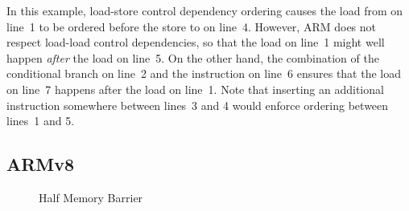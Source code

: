 In this example, load-store control dependency ordering causes
the load from  on line~1 to be ordered before the store to
 on line~4.
However, ARM does not respect load-load control dependencies, so that
the load on line~1 might well happen \emph{after} the
load on line~5.
On the other hand, the combination of the conditional branch on line~2
and the  instruction on line~6 ensures that
the load on line~7 happens after the load on line~1.
Note that inserting an additional  instruction somewhere between
lines~3 and 4 would enforce ordering between lines~1 and 5.

\subsection{ARMv8}

\begin{figure}[tb]
\centering
{}
\caption{Half Memory Barrier}
\end{figure}

